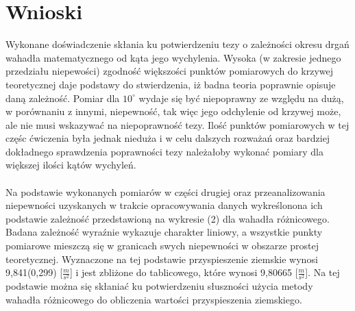 \documentclass[a4paper,10pt]{article}
\begin{document}
\section{Wnioski}
Wykonane doświadczenie skłania ku potwierdzeniu tezy o zależności okresu drgań wahadła matematycznego od kąta jego wychylenia. Wysoka (w zakresie jednego przedziału niepewości) zgodność większości punktów pomiarowych do krzywej teoretycznej daje podstawy do stwierdzenia, iż badna teoria poprawnie opisuje daną zależność. Pomiar dla $10^\circ$ wydaje się być niepoprawny ze względu na dużą, w porównaniu z innymi, niepewność, tak więc jego odchylenie od krzywej może, ale nie musi wskazywać na niepoprawność tezy. Ilość punktów pomiarowych w tej częśc ćwiczenia była jednak nieduża i w celu dalszych rozważań oraz bardziej dokładnego sprawdzenia poprawności tezy należałoby wykonać pomiary dla większej ilości kątów wychyleń.\\
\\
Na podstawie wykonanych pomiarów w części drugiej oraz przeanalizowania niepewności uzyskanych w trakcie opracowywania danych wykreślonona ich podstawie zależność przedstawioną na wykresie (2) dla wahadła różnicowego. Badana zależność wyraźnie wykazuje charakter liniowy, a wszystkie punkty pomiarowe mieszczą się w granicach swych niepewności w obszarze prostej teoretycznej. Wyznaczone na tej podstawie przyspieszenie ziemskie wynosi 9,841(0,299) [$\frac{m}{s^2}$] i jest zbliżone do tablicowego, które wynosi 9,80665 [$\frac{m}{s^2}$]. Na tej podstawie można się skłaniać ku potwierdzeniu słuszności użycia metody wahadła różnicowego do obliczenia wartości przyspieszenia ziemskiego.
\end{document}
